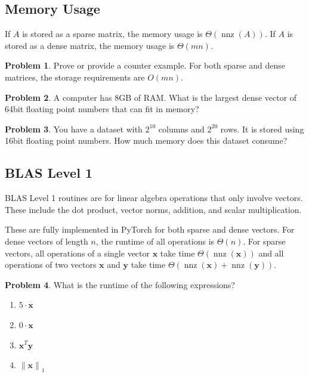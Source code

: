 \documentclass[10pt]{article}
\theoremstyle{definition}
\newtheorem{problem}{Problem}
\DeclareMathOperator{\nnz}{nnz}
\newcommand{\trans}[1]{{#1}^{T}}
\newcommand{\x}{\mathbf x}
\newcommand{\y}{\mathbf y}
\newcommand{\lone}[1]{{\lVert {#1} \rVert}_1}
\begin{document}
\newpage
\subsection{Memory Usage}

If $A$ is stored as a sparse matrix,
the memory usage is $\Theta(\nnz(A))$.
If $A$ is stored as a dense matrix,
the memory usage is $\Theta(mn)$.

\begin{problem}
    Prove or provide a counter example.
    For both sparse and dense matrices,
    the storage requirements are $O(mn)$.
    \vspace{4in}
\end{problem}

\newpage
\begin{problem}
    A computer has 8GB of RAM.
    What is the largest dense vector of 64bit floating point numbers that can fit in memory?
    \vspace{4in}
\end{problem}

\begin{problem}
    You have a dataset with $2^{10}$ columns and $2^{20}$ rows.
    It is stored using 16bit floating point numbers.
    How much memory does this dataset consume?
    \vspace{4in}
\end{problem}

\newpage
\subsection{BLAS Level 1}

BLAS Level 1 routines are for linear algebra operations that only involve vectors.
These include the dot product, vector norms, addition, and scalar multiplication.

These are fully implemented in PyTorch for both sparse and dense vectors.
For dense vectors of length $n$, the runtime of all operations is $\Theta(n)$.
For sparse vectors, all operations of a single vector $\x$ take time $\Theta(\nnz(\x))$
and all operations of two vectors $\x$ and $\y$ take time $\Theta(\nnz(\x)+\nnz(\y))$.

\begin{problem}
    What is the runtime of the following expressions?
    \begin{enumerate}
        \item $5 \cdot \x$
            \vspace{2in}
        \item $0 \cdot \x$
            \vspace{2in}
        \item $\trans\x \y$
            \vspace{2in}
        \item $\lone{\x}$
            \vspace{2in}
    \end{enumerate}
\end{problem}
\end{document}
